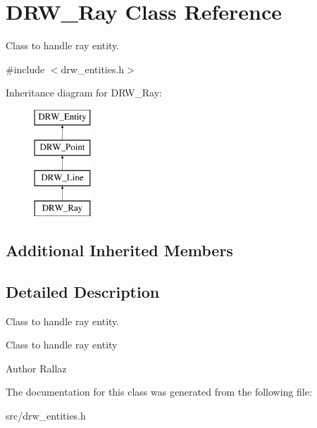 \hypertarget{class_d_r_w___ray}{}\section{D\+R\+W\+\_\+\+Ray Class Reference}
\label{class_d_r_w___ray}


Class to handle ray entity.  




{\ttfamily \#include $<$drw\+\_\+entities.\+h$>$}

Inheritance diagram for D\+R\+W\+\_\+\+Ray\+:\begin{figure}[H]
\begin{center}
\leavevmode
\includegraphics[height=4.000000cm]{dc/df9/class_d_r_w___ray}
\end{center}
\end{figure}
\subsection*{Additional Inherited Members}


\subsection{Detailed Description}
Class to handle ray entity. 

Class to handle ray entity \begin{DoxyAuthor}{Author}
Rallaz 
\end{DoxyAuthor}


The documentation for this class was generated from the following file\+:\begin{DoxyCompactItemize}
\item 
src/drw\+\_\+entities.\+h\end{DoxyCompactItemize}
